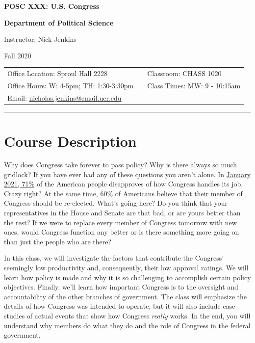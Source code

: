 \documentclass[11pt]{article}
\title{\coursename}
\author{\semester}
\date{\semester}
\makeatletter
\newcommand{\coursenum}{POSC XXX}
\newcommand{\coursename}{U.S. Congress}
\newcommand{\department}{Political Science}
\newcommand{\semester}{Fall 2020}
\newcommand{\roomnumb}{CHASS 1020}
\newcommand{\classtimes}{MW: 9 - 10:15am}
\newcommand{\myname}{Nick Jenkins}
\newcommand{\myemail}{nicholas.jenkins@email.ucr.edu}
\newcommand{\office}{Sproul Hall 2228}
\newcommand{\officehours}{W: 4-5pm; TH: 1:30-3:30pm}
\makeatother
\begin{document}
\begin{center}
\LARGE \textbf{{\coursenum}: {\coursename}}

\LARGE \textbf{Department of \department}

\Large Instructor: \myname

\Large \semester
\end{center}

\begin{center}
\begin{tabular}{l c l}
Office Location: \office & & Classroom: \roomnumb \\
Office Hours: \officehours & & Class Times: \classtimes \\
Email: \href{mailto:\myemail}{\myemail} & & \\
\end{tabular}
\end{center}

\noindent\rule{16.5cm}{0.4pt}


\section*{Course Description}

Why does Congress take forever to pass policy? Why is there always so much gridlock? If you have ever had any of these questions you aren't alone. In \href{https://news.gallup.com/poll/1600/congress-public.aspx}{January 2021, 71\%} of the American people disapproves of how Congress handles its job. Crazy right? At the same time, \href{https://news.gallup.com/poll/1600/congress-public.aspx}{60\%} of Americans believe that their member of Congress should be re-elected. What's going here? Do you think that your representatives in the House and Senate are that bad, or are yours better than the rest? If we were to replace every member of Congress tomorrow with new ones, would Congress function any better or is there something more going on than just the people who are there?

In this class, we will investigate the factors that contribute the Congress' seemingly low productivity and, consequently, their low approval ratings. We will learn how policy is made and why it is so challenging to accomplish certain policy objectives. Finally, we'll learn how important Congress is to the oversight and accountability of the other branches of government. The class will emphasize the details of how Congress was intended to operate, but it will also include case studies of actual events that show how Congress \textit{really} works. In the end, you will understand why members do what they do and the role of Congress in the federal government.
\end{document}
